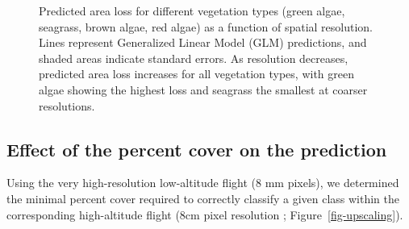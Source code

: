\documentclass[
  letterpaper,
  11pt,
  english,
  singlespacing,
  headsepline]{MastersDoctoralThesis}
\begin{document}
\begin{spacing}{1.5}
\begin{figure}

\caption{\label{fig-pixelsize}Predicted area loss for different
vegetation types (green algae, seagrass, brown algae, red algae) as a
function of spatial resolution. Lines represent Generalized Linear Model
(GLM) predictions, and shaded areas indicate standard errors. As
resolution decreases, predicted area loss increases for all vegetation
types, with green algae showing the highest loss and seagrass the
smallest at coarser resolutions.}

\end{figure}%

\subsection{Effect of the percent cover on the
prediction}\label{effect-of-the-percent-cover-on-the-prediction}

Using the very high-resolution low-altitude flight (8 mm pixels), we
determined the minimal percent cover required to correctly classify a
given class within the corresponding high-altitude flight (8cm pixel
resolution ; Figure~\ref{fig-upscaling}).

\begin{figure}

\centering{

}
\end{figure}
\end{spacing}
\end{document}
